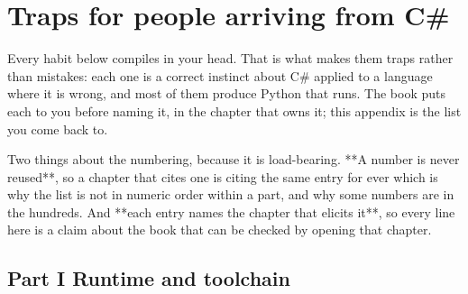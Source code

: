 
\chapter{Traps for people arriving from C\#}
\label{app:traps}

\noindent
Every habit below compiles in your head. That is what makes them traps
rather than mistakes: each one is a correct instinct about C\# applied to a
language where it is wrong, and most of them produce Python that runs. The
book puts each to you before naming it, in the chapter that owns it; this
appendix is the list you come back to.

Two things about the numbering, because it is load-bearing. **A number is
never reused**, so a chapter that cites one is citing the same entry for
ever \dash{} which is why the list is not in numeric order within a part,
and why some numbers are in the hundreds. And **each entry names the
chapter that elicits it**, so every line here is a claim about the book
that can be checked by opening that chapter.

\section{Part I \dash{} Runtime and toolchain}
\label{sec:appB-part1}




